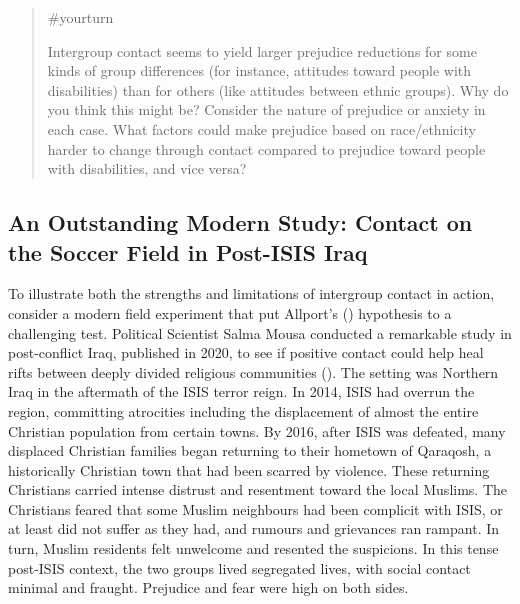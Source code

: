 \documentclass[
  letterpaper,
]{book}
\begin{document}
\begin{quote}
{\#yourturn}

Intergroup contact seems to yield larger prejudice reductions for some
kinds of group differences (for instance, attitudes toward people with
disabilities) than for others (like attitudes between ethnic groups).
Why do you think this might be? Consider the nature of prejudice or
anxiety in each case. What factors could make prejudice based on
race/ethnicity harder to change through contact compared to prejudice
toward people with disabilities, and vice versa?
\end{quote}

\subsection{An Outstanding Modern Study: Contact on the Soccer Field in
Post-ISIS
Iraq}\label{an-outstanding-modern-study-contact-on-the-soccer-field-in-post-isis-iraq}

To illustrate both the strengths and limitations of intergroup contact
in action, consider a modern field experiment that put Allport's
() hypothesis to a challenging test.
Political Scientist Salma Mousa conducted a remarkable study in
post-conflict Iraq, published in 2020, to see if positive contact could
help heal rifts between deeply divided religious communities
(). The setting was
Northern Iraq in the aftermath of the ISIS terror reign. In 2014, ISIS
had overrun the region, committing atrocities including the displacement
of almost the entire Christian population from certain towns. By 2016,
after ISIS was defeated, many displaced Christian families began
returning to their hometown of Qaraqosh, a historically Christian town
that had been scarred by violence. These returning Christians carried
intense distrust and resentment toward the local Muslims. The Christians
feared that some Muslim neighbours had been complicit with ISIS, or at
least did not suffer as they had, and rumours and grievances ran
rampant. In turn, Muslim residents felt unwelcome and resented the
suspicions. In this tense post-ISIS context, the two groups lived
segregated lives, with social contact minimal and fraught. Prejudice and
fear were high on both sides.
\end{document}
